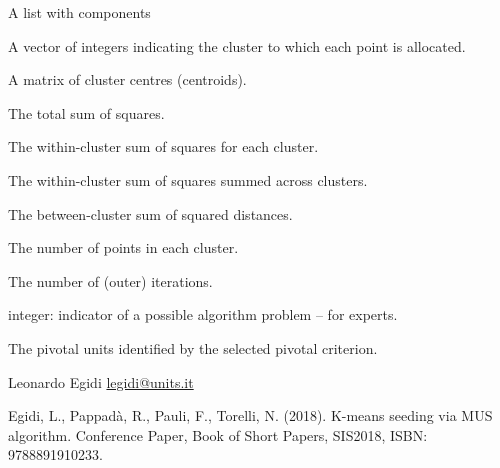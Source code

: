 \documentclass[a4paper]{book}
\begin{document}
\begin{Value}
A list with components

\begin{ldescription}
\item[\code{\code{cluster}}] A vector of integers indicating the cluster to which each point is allocated.
\item[\code{\code{centers}}] A matrix of cluster centres (centroids).
\item[\code{\code{totss}}] The total sum of squares.
\item[\code{\code{withinss}}] The within-cluster sum of squares for each cluster.
\item[\code{\code{tot.withinss}}] The within-cluster sum of squares summed across clusters.
\item[\code{\code{betwennss}}] The between-cluster sum of squared distances.
\item[\code{\code{size}}]  The number of points in each cluster.
\item[\code{\code{iter}}] The number of (outer) iterations.
\item[\code{\code{ifault}}] integer: indicator of a possible algorithm problem – for experts.
\item[\code{\code{pivots}}] The pivotal units identified by the selected pivotal criterion.
\end{ldescription}
\end{Value}
%
\begin{Author}\relax
Leonardo Egidi \url{legidi@units.it}
\end{Author}
%
\begin{References}\relax
Egidi, L., Pappadà, R., Pauli, F., Torelli, N. (2018).
K-means seeding via MUS algorithm. Conference Paper,
Book of Short Papers, SIS2018, ISBN: 9788891910233.
\end{References}
%
\end{document}
